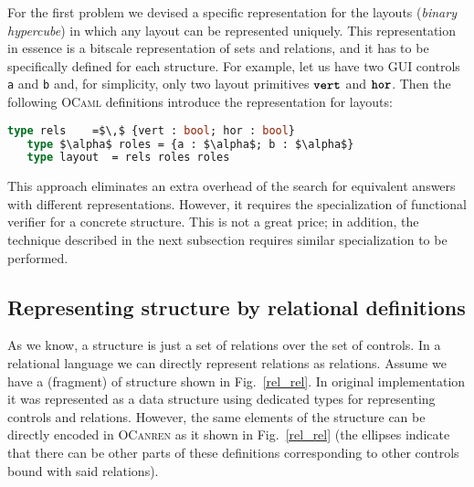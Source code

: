 For the first problem we devised a specific representation for the layouts (\emph{binary hypercube}) in which any layout can be
represented uniquely. This representation in essence is a bitscale representation of sets and relations, and it has to
be specifically defined for each structure. For example, let us have two GUI controls \lstinline|a| and \lstinline|b| and, for
simplicity, only two layout primitives $\mbox{\texttt{\textbf{vert}}}$ and $\mbox{\texttt{\textbf{hor}}}$. Then the following \textsc{OCaml} definitions introduce
the representation for layouts:

\begin{lstlisting}[basicstyle=\small,language=ocaml]
   type rels    =$\,$ {vert : bool; hor : bool}
   type $\alpha$ roles = {a : $\alpha$; b : $\alpha$}
   type layout  = rels roles roles
\end{lstlisting}

This approach eliminates an extra overhead of the search for equivalent answers with different representations. However,
it requires the specialization of functional verifier for a concrete structure. This is not a great price; in addition, the
technique described in the next subsection requires similar specialization to be performed.

\subsection{Representing structure by relational definitions}

As we know, a structure is just a set of relations over the set of controls. In a relational language we can directly
represent relations as relations. Assume we have a (fragment) of structure shown in Fig.~\ref{rel_rel}.
In original implementation it was represented as a data structure using dedicated types for representing
controls and relations. However, the same elements of the structure can be directly encoded in
\textsc{OCanren} as it shown in Fig.~\ref{rel_rel} (the ellipses indicate that there can be other
parts of these definitions corresponding to other controls bound with said relations).

